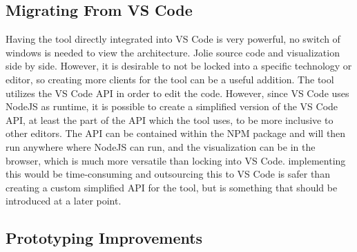 \subsection{Migrating From VS Code}
Having the tool directly integrated into VS Code is very powerful, no switch of windows is needed to view the architecture. Jolie source code and visualization side by side.
However, it is desirable to not be locked into a specific technology or editor, so creating more clients for the tool can be a useful addition. 
The tool utilizes the VS Code API in order to edit the code. However, since VS Code uses NodeJS as runtime, it is possible to create 
a simplified version of the VS Code API, at least the part of the API which the tool uses, to be more inclusive to other editors.
The API can be contained within the NPM package and will then run anywhere where NodeJS can run, and the visualization can be in the browser, which is much more versatile than locking into VS Code.
implementing this would be time-consuming and outsourcing this to VS Code is safer than creating a custom simplified API for the tool,
but is something that should be introduced at a later point.

\subsection{Prototyping Improvements} %
